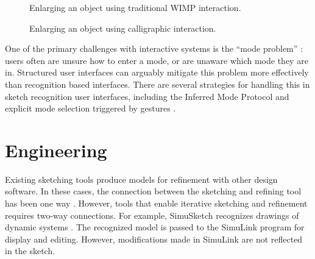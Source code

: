\documentclass[times, 10pt, twocolumn]{article}
\begin{document}
\begin{figure}
  \centering
  \hspace{0.5cm}
  \hspace{0.5cm}
  \caption{Enlarging an object using traditional WIMP interaction.}
  \label{fig:object-handle}
\end{figure}


\begin{figure}
  \centering
  \hspace{0.5cm}
  \hspace{0.5cm}
  \caption{Enlarging an object using calligraphic interaction.}
  \label{fig:object-sketch}
\end{figure}

One of the primary challenges with interactive systems is the ``mode
problem'' \cite{tesler-mode-problem}: users often are unsure how to
enter a mode, or are unaware which mode they are in. Structured user
interfaces can arguably mitigate this problem more effectively than
recognition based interfaces.  There are several strategies for
handling this in sketch recognition user interfaces, including the
Inferred Mode Protocol \cite{saund-inferred-mode} and explicit mode
selection triggered by gestures
\cite{hinckley-scriboli,johnson-flow-selection}.

\section{Engineering}

Existing sketching tools produce models for refinement with other
design software. In these cases, the connection between the sketching
and refining tool has been one way \cite{lin-denim}. However, tools
that enable iterative sketching and refinement requires two-way
connections. For example, SimuSketch recognizes drawings of dynamic
systems \cite{kara-recognizer-uist}. The recognized model is passed to
the SimuLink program for display and editing. However, modifications
made in SimuLink are not reflected in the sketch.
\end{document}
